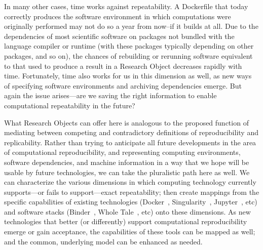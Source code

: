 In many other cases, time works against repeatability.
A Dockerfile that today correctly produces the software environment in which computations were originally
	performed may not do so a year from now--if it builds at all.
Due to the dependencies of most scientific software on packages not
	bundled with the language compiler or runtime (with these packages typically depending on 
	other packages, and so on), the chances of rebuilding or rerunning software
	equivalent to that used to produce a result in a Research Object decreases
	rapidly with time.
Fortunately, time also works for us in this dimension as well, as new ways of specifying software
	environments and archiving dependencies emerge.
But again the issue arises---are we saving the right information to enable computational repeatability
	in the future?

What Research Objects can offer here is analogous to the proposed function of mediating between competing
	and contradictory definitions of reproducibility and replicability.
Rather than trying to anticipate all future developments in the area of computational reproducibility,
	and representing computing environments, software dependencies, and machine information
	in a way that we hope will be usable by future technologies, we can take the pluralistic
	path here as well. 
We can characterize the various dimensions in which computing technology currently supports---or fails to
	support---exact repeatability; then create mappings from the specific capabilities
	of existing technologies (Docker~\cite{docker2019}, Singularity~\cite{Singularity2019}, Jupyter~\cite{jupyter2019}, etc) 
	and software stacks (Binder~\cite{Binder_2018}, Whole Tale~\cite{WT2019}, etc)
	onto these dimensions.
As new technologies that better (or differently) support computational reproducibility emerge or gain acceptance,
	the capabilities of these tools can be mapped as well; and the common, underlying model can be enhanced as needed.
 

